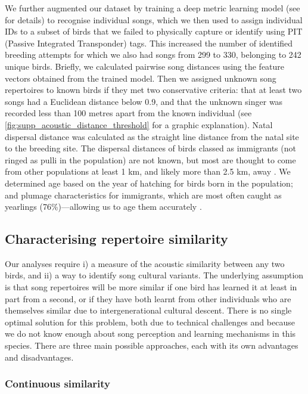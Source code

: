 We further augmented our dataset by training a deep metric learning model (see \parencite{merinorecalde2023a} for details) to recognise individual songs, which we then used to assign individual IDs to a subset of birds that we failed to physically capture or identify using PIT (Passive Integrated Transponder) tags. This increased the number of identified breeding attempts for which we also had songs from 299 to 330, belonging to 242 unique birds. Briefly, we calculated pairwise song distances using the feature vectors obtained from the trained model. Then we assigned unknown song repertoires to known birds if they met two conservative criteria: that at least two songs had a Euclidean distance below 0.9, and that the unknown singer was recorded less than 100 metres apart from the known individual (see \autoref{fig:supp_acoustic_distance_threshold} for a graphic explanation).
Natal dispersal distance was calculated as the straight line distance from the natal site to the breeding site. The dispersal distances of birds classed as immigrants (not ringed as pulli in the population) are not known, but most are thought to come from other populations at least 1 km, and likely more than 2.5 km, away \parencite{verhulst1997, quinn2011}. We determined age based on the year of hatching for birds born in the population; and plumage characteristics for immigrants, which are most often caught as yearlings (76\%)---allowing us to age them accurately \parencite{woodman2023}.

\subsection{Characterising repertoire similarity}

Our analyses require i) a measure of the acoustic similarity between any two birds, and ii) a way to identify song cultural variants.  The underlying assumption is that song repertoires will be more similar if one bird has learned it at least in part from a second, or if they have both learnt from other individuals who are themselves similar due to intergenerational cultural descent. There is no single optimal solution for this problem, both due to technical challenges and because we do not know enough about song perception and learning mechanisms in this species. There are three main possible approaches, each with its own advantages and disadvantages.

\subsubsection{Continuous similarity}

